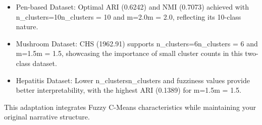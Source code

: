 \begin{itemize}

\item Pen-based Dataset: Optimal ARI (0.6242) and NMI (0.7073) achieved with n_clusters=10n\_clusters = 10 and m=2.0m = 2.0, reflecting its 10-class nature.

\item Mushroom Dataset: CHS (1962.91) supports n_clusters=6n\_clusters = 6 and m=1.5m = 1.5, showcasing the importance of small cluster counts in this two-class dataset.

\item Hepatitis Dataset: Lower n_clustersn\_clusters and fuzziness values provide better interpretability, with the highest ARI (0.1389) for m=1.5m = 1.5.

\end{itemize}

This adaptation integrates Fuzzy C-Means characteristics while maintaining your original narrative structure.

